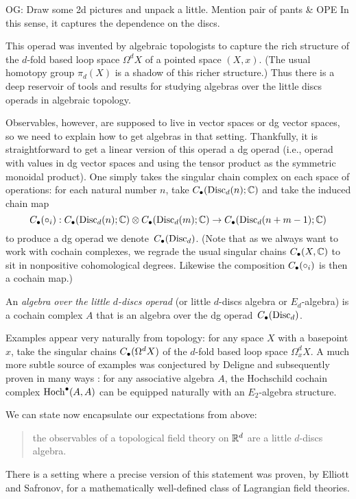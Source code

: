 \documentclass[11pt]{amsart}
\def\owen#1{{\textcolor{violet!50!black}{OG: {#1}}}}
\begin{document}
\owen{Draw some 2d pictures and unpack a little. Mention pair of pants \& OPE} 
In this sense, it captures the dependence on the discs.

This operad was invented by algebraic topologists to capture the rich structure of the $d$-fold based loop space $\Omega^d X$ of a pointed space $(X,x)$.
(The usual homotopy group $\pi_d(X)$ is a shadow of this richer structure.)
Thus there is a deep reservoir of tools and results for studying algebras over the little discs operads in algebraic topology.

Observables, however, are supposed to live in vector spaces or dg vector spaces,
so we need to explain how to get algebras in that setting.
Thankfully, it is straightforward to get a linear version of this operad a dg operad (i.e., operad with values in dg vector spaces and using the tensor product as the symmetric monoidal product).
One simply takes the singular chain complex on each space of operations:
for each natural number $n$, take $C_\bullet({\rm Disc}_d(n); \mathbb C)$ and take the induced chain map 
\[
C_\bullet(\circ_i): C_\bullet({\rm Disc}_d(n); \mathbb C) \otimes C_\bullet({\rm Disc}_d(m); \mathbb C) \to C_\bullet({\rm Disc}_d(n+m-1); \mathbb C)
\]
to produce a dg operad we denote~$C_\bullet({\rm Disc}_d)$.
(Note that as we always want to work with cochain complexes, we regrade the usual singular chains $C_\bullet(X, \mathbb C)$ to sit in nonpositive cohomological degrees. 
Likewise the composition $C_\bullet(\circ_i)$ is then a cochain map.)

\begin{dfn}
An {\em algebra over the little $d$-discs operad} (or little $d$-discs algebra or $E_d$-algebra) is a cochain complex $A$ that is an algebra over the dg operad~$C_\bullet({\rm Disc}_d)$.
\end{dfn}

Examples appear very naturally from topology: for any space $X$ with a basepoint $x$, take the singular chains $C_\bullet(\Omega^d X)$ of the $d$-fold based loop space $\Omega^d_x X$.
A much more subtle source of examples was conjectured by Deligne and subsequently proven in many ways \cite{}: 
for any associative algebra $A$, the Hochschild cochain complex ${\rm Hoch}^\bullet(A,A)$ can be equipped naturally with an $E_2$-algebra structure.

We can state now encapsulate our expectations from above:
\begin{quote}
the observables of a topological field theory on $\mathbb R^d$ are a little $d$-discs algebra.
\end{quote}
There is a setting where a precise version of this statement was proven, by Elliott and Safronov, for a mathematically well-defined class of Lagrangian field theories.
\end{document}
